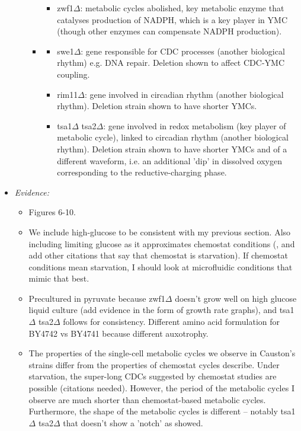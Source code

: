 \begin{itemize}
\begin{itemize}
\begin{itemize}
\begin{itemize}
\item zwf1\(\Delta\): metabolic cycles abolished, key metabolic enzyme that catalyses production of NADPH, which is a key player in YMC (though other enzymes can compensate NADPH production).
\end{itemize}
\item \cite{caustonMetabolicCyclesYeast2015}
\begin{itemize}
\item swe1\(\Delta\): gene responsible for CDC processes (another biological rhythm) e.g. DNA repair.  Deletion shown to affect CDC-YMC coupling.
\item rim11\(\Delta\): gene involved in circadian rhythm (another biological rhythm).  Deletion strain shown to have shorter YMCs.
\item tsa1\(\Delta\) tsa2\(\Delta\): gene involved in redox metabolism (key player of metabolic cycle), linked to circadian rhythm (another biological rhythm).  Deletion strain shown to have shorter YMCs and of a different waveform, i.e. an additional 'dip' in dissolved oxygen corresponding to the reductive-charging phase.
\end{itemize}
\end{itemize}
\end{itemize}
\item \emph{Evidence:}
\begin{itemize}
\item Figures 6-10.
\item We include high-glucose to be consistent with my previous section.  Also including limiting glucose as it approximates chemostat conditions (\cite{jonesCyberneticModelGrowth1999}, and add other citations that say that chemostat is starvation).  If chemostat conditions mean starvation, I should look at microfluidic conditions that mimic that best.
\item Precultured in pyruvate because zwf1\(\Delta\) doesn't grow well on high glucose liquid culture (add evidence in the form of growth rate graphs), and tsa1\(\Delta\) tsa2\(\Delta\) follows for consistency.  Different amino acid formulation for BY4742 vs BY4741 because different auxotrophy.
\item The properties of the single-cell metabolic cycles we observe in Causton's strains differ from the properties of chemostat cycles \cite{caustonMetabolicCyclesYeast2015} describe.  Under starvation, the super-long CDCs suggested by chemostat studies are possible (citations needed).  However, the period of the metabolic cycles I observe are much shorter than chemostat-based metabolic cycles.  Furthermore, the shape of the metabolic cycles is different -- notably tsa1\(\Delta\) tsa2\(\Delta\) that doesn't show a 'notch' as \cite{caustonMetabolicCyclesYeast2015} showed.
\end{itemize}


\end{itemize}
